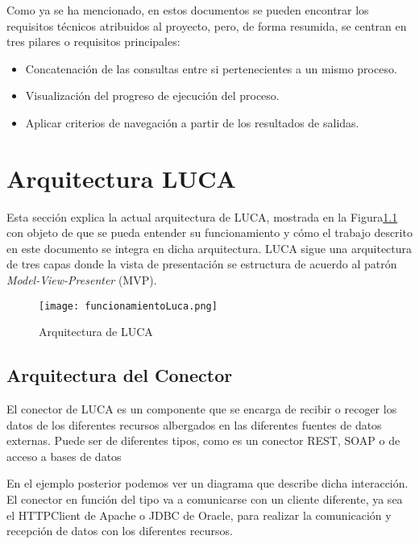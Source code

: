 Como ya se ha mencionado, en estos documentos se pueden encontrar los requisitos técnicos atribuidos al proyecto, pero, de forma resumida, se centran en tres pilares o requisitos principales:



\begin{itemize}
	\item  Concatenación de las consultas entre si pertenecientes a un mismo proceso.
	\item  Visualización del progreso de ejecución del proceso.
	\item Aplicar criterios de navegación a partir de los resultados de salidas.
\end{itemize}


\section{Arquitectura LUCA}


Esta sección explica la actual arquitectura de LUCA, mostrada en la Figura\ref{} con objeto de que se pueda entender su funcionamiento y cómo el trabajo descrito en este documento se integra en dicha arquitectura. LUCA sigue una arquitectura de tres capas donde la vista de presentación se estructura de acuerdo al patrón \emph{Model-View-Presenter} (MVP).


\begin{figure}[!tb]
	\centering
	\texttt{[image: funcionamientoLuca.png]}
	\caption{Arquitectura de LUCA}
    \label{fig:funcionamientoLuca}
\end{figure}



\subsection{Arquitectura del Conector}


El conector de LUCA es un componente que se encarga de recibir o recoger los datos de los diferentes recursos albergados en las diferentes fuentes de datos externas. Puede ser de diferentes tipos, como es un conector REST, SOAP o de acceso a bases de datos

En el ejemplo posterior podemos ver un diagrama que describe dicha interacción. El conector en función del tipo va a comunicarse con un cliente diferente, ya sea el HTTPClient \cite{httpclient} de Apache o JDBC \cite{jdbc} de Oracle, para realizar la comunicación y recepción de datos con los diferentes recursos.

